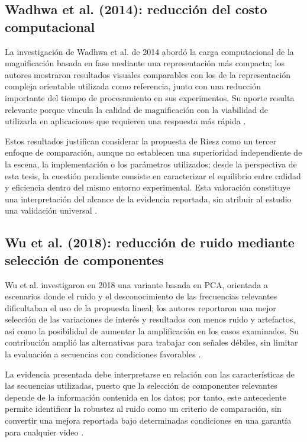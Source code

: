 \subsection{Wadhwa et al. (2014): reducción del costo computacional}

La investigación de Wadhwa et al. de 2014 abordó la carga computacional de la magnificación basada en fase mediante una representación más compacta; los autores mostraron resultados visuales comparables con los de la representación compleja orientable utilizada como referencia, junto con una reducción importante del tiempo de procesamiento en sus experimentos. Su aporte resulta relevante porque vincula la calidad de magnificación con la viabilidad de utilizarla en aplicaciones que requieren una respuesta más rápida \cite{wadhwa2014riesz}.

Estos resultados justifican considerar la propuesta de Riesz como un tercer enfoque de comparación, aunque no establecen una superioridad independiente de la escena, la implementación o los parámetros utilizados; desde la perspectiva de esta tesis, la cuestión pendiente consiste en caracterizar el equilibrio entre calidad y eficiencia dentro del mismo entorno experimental. Esta valoración constituye una interpretación del alcance de la evidencia reportada, sin atribuir al estudio una validación universal \cite{wadhwa2014riesz,ahmed2023overview}.

\subsection{Wu et al. (2018): reducción de ruido mediante selección de componentes}

Wu et al. investigaron en 2018 una variante basada en \gls{PCA}, orientada a escenarios donde el ruido y el desconocimiento de las frecuencias relevantes dificultaban el uso de la propuesta lineal; los autores reportaron una mejor selección de las variaciones de interés y resultados con menos ruido y artefactos, así como la posibilidad de aumentar la amplificación en los casos examinados. Su contribución amplió las alternativas para trabajar con señales débiles, sin limitar la evaluación a secuencias con condiciones favorables \cite{wu2018pca}.

La evidencia presentada debe interpretarse en relación con las características de las secuencias utilizadas, puesto que la selección de componentes relevantes depende de la información contenida en los datos; por tanto, este antecedente permite identificar la robustez al ruido como un criterio de comparación, sin convertir una mejora reportada bajo determinadas condiciones en una garantía para cualquier video \cite{wu2018pca}.

